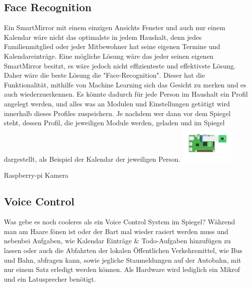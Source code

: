\subsection{Face Recognition}
Ein SmartMirror mit einem einzigen Ansichts Fenster und auch nur einem Kalendar wäre nicht das optimalste in jedem Haushalt, denn jedes Familienmitglied oder jeder Mitbewohner hat seine eigenen Termine und Kalendareinträge. Eine mögliche Lösung wäre das jeder seinen eigenen SmartMirror besitzt, es wäre jedoch nicht effizienteste und effektivste Lösung. Daher wäre die beste Lösung die "Face-Recognition". Dieser hat die Funktionalität, mithilfe von Machine Learning sich das Gesicht zu merken und es auch wiederzuerkennen. Es könnte dadurch für jede Person im Haushalt ein Profil angelegt werden, und alles was an Modulen und Einstellungen getätigt wird innerhalb dieses Profiles zuspeichern. Je nachdem wer dann vor dem Spiegel steht, dessen Profil, die jeweiligen Module werden, geladen und im Spiegel dargestellt, als Beispiel der Kalendar der jeweiligen Person. 
 \includegraphics[width=100]{pictures/raspberry-pi-camera-2.png}
 \caption{Raspberry-pi Kamera}

\subsection{Voice Control}
Was gebe es noch cooleres als ein Voice Control System im Spiegel? Während man am Haare fönen ist oder der Bart mal wieder rasiert werden muss und nebenbei Aufgaben, wie Kalendar Einträge & Todo-Aufgaben hinzufügen zu lassen oder auch die Abfahrten der lokalen Öffentlichen Verkehrsmittel, wie Bus und Bahn,  abfragen kann, sowie jegliche Staumeldungen auf der Autobahn, mit nur einem Satz erledigt werden können. Als Hardware wird lediglich ein Mikrof und ein Latusprecher benötigt.


